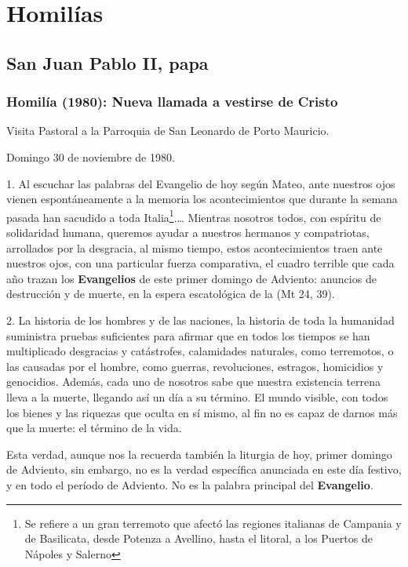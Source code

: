\section{Homilías}

\subsection{San Juan Pablo II, papa}

\subsubsection{Homilía (1980): Nueva llamada a vestirse de Cristo}

Visita Pastoral a la Parroquia de San Leonardo de Porto Mauricio.

Domingo 30 de noviembre de 1980.

1. Al escuchar las palabras del Evangelio de hoy según Mateo, ante nuestros ojos vienen espontáneamente a la memoria los acontecimientos que durante la semana pasada han sacudido a toda Italia\footnote{Se refiere a un gran terremoto que afectó las regiones italianas de Campania y de Basilicata, desde Potenza a Avellino, hasta el litoral, a los Puertos de Nápoles y Salerno}.\ldots{} Mientras nosotros todos, con espíritu de solidaridad humana, queremos ayudar a nuestros hermanos y compatriotas, arrollados por la desgracia, al mismo tiempo, estos acontecimientos traen ante nuestros ojos, con una particular fuerza comparativa, el cuadro terrible que cada año trazan los \textbf{Evangelios} de este primer domingo de Adviento: anuncios de destrucción y de muerte, en la espera escatológica de la  (Mt 24, 39).

2. La historia de los hombres y de las naciones, la historia de toda la humanidad suministra pruebas suficientes para afirmar que en todos los tiempos se han multiplicado desgracias y catástrofes, calamidades naturales, como terremotos, o las causadas por el hombre, como guerras, revoluciones, estragos, homicidios y genocidios. Además, cada uno de nosotros sabe que nuestra existencia terrena lleva a la muerte, llegando así un día a su término. El mundo visible, con todos los bienes y las riquezas que oculta en sí mismo, al fin no es capaz de darnos más que la muerte: el término de la vida.

Esta verdad, aunque nos la recuerda también la liturgia de hoy, primer domingo de Adviento, sin embargo, no es la verdad específica anunciada en este día festivo, y en todo el período de Adviento. No es la palabra principal del \textbf{Evangelio}.

